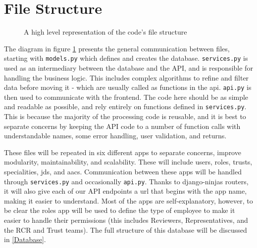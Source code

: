\section{File Structure}
\begin{figure}[h]
\centering
{}
\vspace{-20pt}
\caption{A high level representation of the code's file structure}
\label{fig:file-design}
\end{figure}
\vspace{-5pt}
The diagram in figure \ref{fig:file-design} presents the general communication between files, starting with \texttt{models.py} which defines and creates the database. \texttt{services.py} is used as an intermediary between the database and the API, and is responsible for handling the business logic. This includes complex algorithms to refine and filter data before moving it - which are usually called as functions in the api. \texttt{api.py} is then used to communicate with the frontend. The code here should be as simple and readable as possible, and rely entirely on functions defined in \texttt{services.py}. This is because the majority of the processing code is reusable, and it is best to separate concerns by keeping the API code to a number of function calls with understandable names, some error handling, user validation, and returns.

These files will be repeated in six different apps to separate concerns, improve modularity, maintainability, and scalability. These will include users, roles, trusts, specialities, jds, and aacs. Communication between these apps will be handled through \texttt{services.py} and occasionally \texttt{api.py}. Thanks to django-ninjas routers, it will also give each of our API endpoints a url that begins with the app name, making it easier to understand. Most of the apps are self-explanatory, however, to be clear the roles app will be used to define the type of employee to make it easier to handle their permissions (this includes Reviewers, Representatives, and the RCR and Trust teams). The full structure of this database will be discussed in \ref{Database}.

